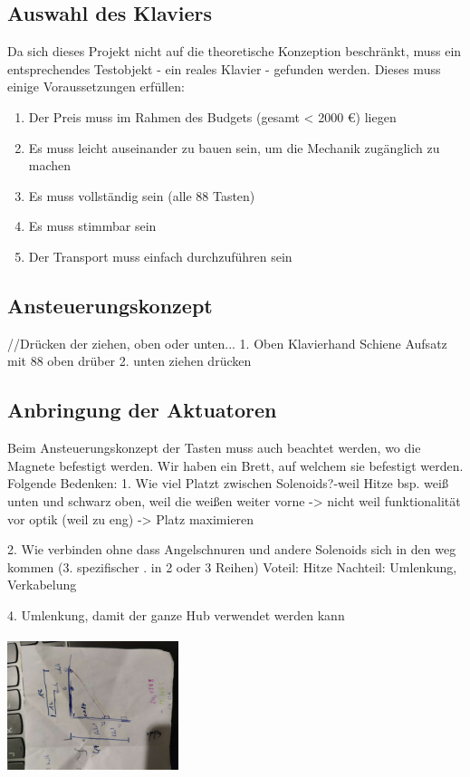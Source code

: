 \subsection{Auswahl des Klaviers}

Da sich dieses Projekt nicht auf die theoretische Konzeption beschränkt, muss ein entsprechendes Testobjekt - ein reales Klavier - gefunden werden.
Dieses muss einige Voraussetzungen erfüllen:
\begin{enumerate}
	\item 	Der Preis muss im Rahmen des Budgets (gesamt < 2000 €) liegen
	\item 	Es muss leicht auseinander zu bauen sein, um die Mechanik zugänglich zu machen
	\item 	Es muss vollständig sein (alle 88 Tasten)
	\item 	Es muss stimmbar sein
	\item 	Der Transport muss einfach durchzuführen sein
\end{enumerate}


\subsection{Ansteuerungskonzept}

//Drücken der ziehen, oben oder unten...
1. Oben
	Klavierhand
	Schiene
	Aufsatz mit 88 oben drüber
2. unten
	ziehen
	drücken

\subsection{Anbringung der Aktuatoren}
Beim Ansteuerungskonzept der Tasten muss auch beachtet werden, wo die Magnete befestigt werden.
Wir haben ein Brett, auf welchem sie befestigt werden. Folgende Bedenken:
1. Wie viel Platzt zwischen Solenoids?-weil Hitze
bsp. weiß unten und schwarz oben, weil die weißen weiter vorne
	-> nicht weil funktionalität vor optik (weil zu eng)
 -> Platz maximieren

2. Wie verbinden ohne dass Angelschnuren und andere Solenoids sich in den weg kommen
(3. spezifischer . in 2 oder 3 Reihen)
Voteil: Hitze
Nachteil: Umlenkung, Verkabelung

4. Umlenkung, damit der ganze Hub verwendet werden kann

\includegraphics [width=5cm, height=4cm,angle=-90] {img/skizze_Umlenkung}

